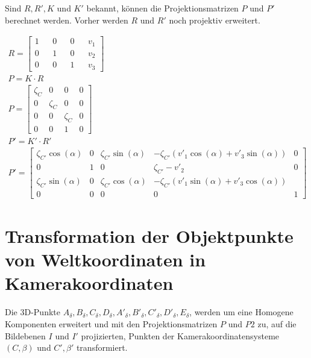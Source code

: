 Sind $R,R',K$ und $K'$ bekannt, können die Projektionsmatrizen $P$ und $P'$ berechnet werden. Vorher werden $R$ und $R'$ noch projektiv erweitert.


\begin{gather}
R=
\begin{bmatrix}
1&&0&&0&&v_1\\
0&&1&&0&&v_2\\
0&&0&&1&&v_3
\end{bmatrix}\\
P = K\cdot R \\
P =
\begin{bmatrix}
\zeta_{C}&0&0&0\\
0&\zeta_{C}&0&0\\
0&0&\zeta_{C}&0\\
0&0&1&0
\end{bmatrix}\\
P' = K' \cdot R'\\
P' =
\begin{bmatrix}
\zeta_{C'} \cos(\alpha)&0&\zeta_{C'} \sin(\alpha)&-\zeta_{C'} (v'_1\cos(\alpha)+v'_3\sin(\alpha) )&0\\
0&1&0&\zeta_{C'}-v'_2&0\\
\zeta_{C'}\sin(\alpha)&0&\zeta_{C'}\cos(\alpha)&-\zeta_{C'}(v'_1\sin(\alpha)+v'_3\cos(\alpha))\\
0&0&0&0&1
\end{bmatrix}
\end{gather}



\section{Transformation der Objektpunkte von Weltkoordinaten in Kamerakoordinaten}

Die 3D-Punkte $A_\delta,B_\delta,C_\delta,D_\delta,A'_\delta,B'_\delta,C'_\delta,D'_\delta, E_\delta$, werden um eine Homogene Komponenten erweitert und mit den Projektionsmatrizen \ensuremath{P} und \ensuremath{P2} zu, auf die Bildebenen $I$ und $I'$ projizierten, Punkten der Kamerakoordinatensysteme $(C,\beta)$ und $C',\beta'$ transformiert.


